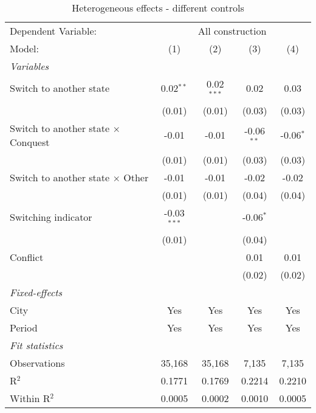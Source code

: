 \begin{table}[htbp]
   \caption{\label{tab:controls_10y} Heterogeneous effects - different controls}
   \centering
   \begin{tabular}{lcccc}
      \tabularnewline \midrule \midrule
      Dependent Variable: & \multicolumn{4}{c}{All construction}\\
      Model:                                     & (1)           & (2)          & (3)          & (4)\\  
      \midrule
      \emph{Variables}\\
      Switch to another state                    & 0.02$^{**}$   & 0.02$^{***}$ & 0.02         & 0.03\\   
                                                 & (0.01)        & (0.01)       & (0.03)       & (0.03)\\   
      Switch to another state $\times$ Conquest  & -0.01         & -0.01        & -0.06$^{**}$ & -0.06$^{*}$\\   
                                                 & (0.01)        & (0.01)       & (0.03)       & (0.03)\\   
      Switch to another state $\times$ Other     & -0.01         & -0.01        & -0.02        & -0.02\\   
                                                 & (0.01)        & (0.01)       & (0.04)       & (0.04)\\   
      Switching indicator                        & -0.03$^{***}$ &              & -0.06$^{*}$  &   \\   
                                                 & (0.01)        &              & (0.04)       &   \\   
      Conflict                                   &               &              & 0.01         & 0.01\\   
                                                 &               &              & (0.02)       & (0.02)\\   
      \midrule
      \emph{Fixed-effects}\\
      City                                       & Yes           & Yes          & Yes          & Yes\\  
      Period                                     & Yes           & Yes          & Yes          & Yes\\  
      \midrule
      \emph{Fit statistics}\\
      Observations                               & 35,168        & 35,168       & 7,135        & 7,135\\  
      R$^2$                                      & 0.1771        & 0.1769       & 0.2214       & 0.2210\\  
      Within R$^2$                               & 0.0005        & 0.0002       & 0.0010       & 0.0005\\  
      \midrule \midrule
      

\end{tabular}
\end{table}
